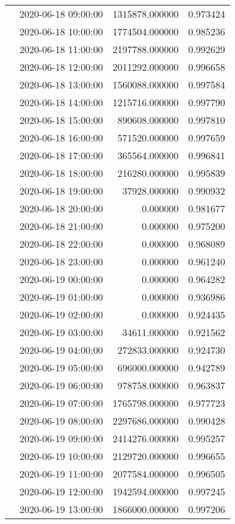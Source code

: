 \begin{tabular}{llrr}
 & 2020-06-18 09:00:00 & 1315878.000000 & 0.973424 \\
 & 2020-06-18 10:00:00 & 1774504.000000 & 0.985236 \\
 & 2020-06-18 11:00:00 & 2197788.000000 & 0.992629 \\
 & 2020-06-18 12:00:00 & 2011292.000000 & 0.996658 \\
 & 2020-06-18 13:00:00 & 1560088.000000 & 0.997584 \\
 & 2020-06-18 14:00:00 & 1215716.000000 & 0.997790 \\
 & 2020-06-18 15:00:00 & 890608.000000 & 0.997810 \\
 & 2020-06-18 16:00:00 & 571520.000000 & 0.997659 \\
 & 2020-06-18 17:00:00 & 365564.000000 & 0.996841 \\
 & 2020-06-18 18:00:00 & 216280.000000 & 0.995839 \\
 & 2020-06-18 19:00:00 & 37928.000000 & 0.990932 \\
 & 2020-06-18 20:00:00 & 0.000000 & 0.981677 \\
 & 2020-06-18 21:00:00 & 0.000000 & 0.975200 \\
 & 2020-06-18 22:00:00 & 0.000000 & 0.968089 \\
 & 2020-06-18 23:00:00 & 0.000000 & 0.961240 \\
 & 2020-06-19 00:00:00 & 0.000000 & 0.964282 \\
 & 2020-06-19 01:00:00 & 0.000000 & 0.936986 \\
 & 2020-06-19 02:00:00 & 0.000000 & 0.924435 \\
 & 2020-06-19 03:00:00 & 34611.000000 & 0.921562 \\
 & 2020-06-19 04:00:00 & 272833.000000 & 0.924730 \\
 & 2020-06-19 05:00:00 & 696000.000000 & 0.942789 \\
 & 2020-06-19 06:00:00 & 978758.000000 & 0.963837 \\
 & 2020-06-19 07:00:00 & 1765798.000000 & 0.977723 \\
 & 2020-06-19 08:00:00 & 2297686.000000 & 0.990428 \\
 & 2020-06-19 09:00:00 & 2414276.000000 & 0.995257 \\
 & 2020-06-19 10:00:00 & 2129720.000000 & 0.996655 \\
 & 2020-06-19 11:00:00 & 2077584.000000 & 0.996505 \\
 & 2020-06-19 12:00:00 & 1942594.000000 & 0.997245 \\
 & 2020-06-19 13:00:00 & 1866000.000000 & 0.997206 \\

\end{tabular}

